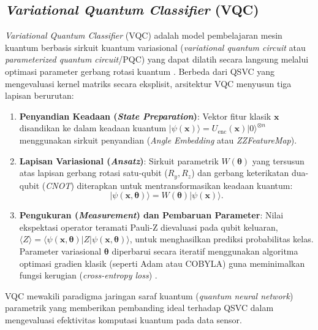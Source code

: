 \subsection{\textit{Variational Quantum Classifier} (VQC)}
\textit{Variational Quantum Classifier} (VQC) adalah model pembelajaran mesin kuantum berbasis sirkuit kuantum variasional (\textit{variational quantum circuit} atau \textit{parameterized quantum circuit}/PQC) yang dapat dilatih secara langsung melalui optimasi parameter gerbang rotasi kuantum \cite{schuld2019quantum}. Berbeda dari QSVC yang mengevaluasi kernel matriks secara eksplisit, arsitektur VQC menyusun tiga lapisan berurutan:
\begin{enumerate}
    \item \textbf{Penyandian Keadaan (\textit{State Preparation})}: Vektor fitur klasik $\mathbf{x}$ disandikan ke dalam keadaan kuantum $|\psi(\mathbf{x})\rangle = U_{\text{enc}}(\mathbf{x})|0\rangle^{\otimes n}$ menggunakan sirkuit penyandian (\textit{Angle Embedding} atau \textit{ZZFeatureMap}).
    \item \textbf{Lapisan Variasional (\textit{Ansatz})}: Sirkuit parametrik $W(\boldsymbol{\theta})$ yang tersusun atas lapisan gerbang rotasi satu-qubit ($R_y, R_z$) dan gerbang keterikatan dua-qubit (\textit{CNOT}) diterapkan untuk mentransformasikan keadaan kuantum:
    \begin{equation}
    |\psi(\mathbf{x}, \boldsymbol{\theta})\rangle = W(\boldsymbol{\theta}) |\psi(\mathbf{x})\rangle.
    \end{equation}
    \item \textbf{Pengukuran (\textit{Measurement}) dan Pembaruan Parameter}: Nilai ekspektasi operator teramati Pauli-Z dievaluasi pada qubit keluaran, $\langle Z \rangle = \langle \psi(\mathbf{x}, \boldsymbol{\theta}) | Z | \psi(\mathbf{x}, \boldsymbol{\theta}) \rangle$, untuk menghasilkan prediksi probabilitas kelas. Parameter variasional $\boldsymbol{\theta}$ diperbarui secara iteratif menggunakan algoritma optimasi gradien klasik (seperti Adam atau COBYLA) guna meminimalkan fungsi kerugian (\textit{cross-entropy loss}) \cite{schuld2019quantum}.
\end{enumerate}
VQC mewakili paradigma jaringan saraf kuantum (\textit{quantum neural network}) parametrik yang memberikan pembanding ideal terhadap QSVC dalam mengevaluasi efektivitas komputasi kuantum pada data sensor.

